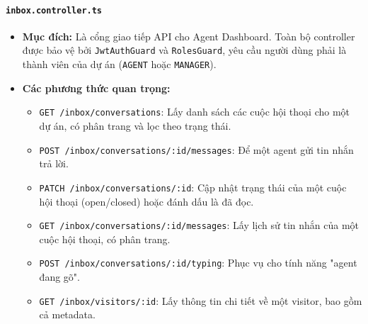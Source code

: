 \paragraph{\texttt{inbox.controller.ts}}
\begin{itemize}
    \item \textbf{Mục đích:} Là cổng giao tiếp API cho Agent Dashboard. Toàn bộ controller được bảo vệ bởi \texttt{JwtAuthGuard} và \texttt{RolesGuard}, yêu cầu người dùng phải là thành viên của dự án (\texttt{AGENT} hoặc \texttt{MANAGER}).
    \item \textbf{Các phương thức quan trọng:}
    \begin{itemize}
        \item \texttt{GET /inbox/conversations}: Lấy danh sách các cuộc hội thoại cho một dự án, có phân trang và lọc theo trạng thái.
        \item \texttt{POST /inbox/conversations/:id/messages}: Để một agent gửi tin nhắn trả lời.
        \item \texttt{PATCH /inbox/conversations/:id}: Cập nhật trạng thái của một cuộc hội thoại (open/closed) hoặc đánh dấu là đã đọc.
        \item \texttt{GET /inbox/conversations/:id/messages}: Lấy lịch sử tin nhắn của một cuộc hội thoại, có phân trang.
        \item \texttt{POST /inbox/conversations/:id/typing}: Phục vụ cho tính năng "agent đang gõ".
        \item \texttt{GET /inbox/visitors/:id}: Lấy thông tin chi tiết về một visitor, bao gồm cả metadata.
    \end{itemize}
\end{itemize}